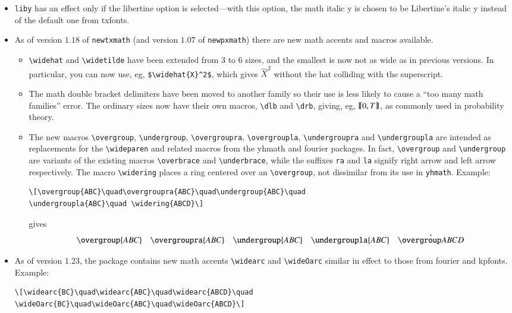 \documentclass[11pt]{article}
\theoremstyle{oldplain}
\theoremstyle{plain}
\begin{document}
\begin{itemize}
\item{\tt liby} has an effect only if the libertine option is selected---with this option, the math italic y is chosen to be Libertine's italic y instead of the default one from txfonts.
\item As of version $1.18$ of {\tt newtxmath} (and version $1.07$ of {\tt newpxmath}) there are new math accents and macros available.
\begin{itemize}
\item
\verb|\widehat| and \verb|\widetilde| have been extended from $3$ to $6$ sizes, and the smallest is now not as wide as in previous versions. In particular, you can now use, eg, \verb|$\widehat{X}^2$|, which gives $\widehat{X}^2$ without the hat colliding with the superscript.
\item The math double bracket delimiters have been moved to another family so their use is less likely to cause a ``too many math families'' error. The ordinary sizes now have their own macros, \verb|\dlb| and \verb|\drb|, giving, eg, $\dlb 0,T\drb$, as commonly used in probability theory.
\item The new macros \verb|\overgroup|, \verb|\undergroup|, \verb|\overgroupra|, \verb|\overgroupla|, \verb|\undergroupra| and \verb|\undergroupla| are intended as replacements for the \verb|\wideparen| and related macros from the \textsf{yhmath} and \textsf{fourier} packages. In fact, \verb|\overgroup| and \verb|\undergroup| are variants of the existing macros \verb|\overbrace| and \verb|\underbrace|, while the suffixes {\tt ra} and {\tt la} signify right arrow and left arrow respectively. The macro \verb|\widering| places a ring centered over an \verb|\overgroup|, not dissimilar from its use in {\tt yhmath}. Example:
\begin{verbatim}
\[\overgroup{ABC}\quad\overgroupra{ABC}\quad\undergroup{ABC}\quad
\undergroupla{ABC}\quad \widering{ABCD}\] 
\end{verbatim}
gives
\[\overgroup{ABC}\quad\overgroupra{ABC}\quad\undergroup{ABC}\quad\undergroupla{ABC}\quad\widering{ABCD}\] 
\end{itemize}
\item As of version $1.23$, the package contains new math accents \verb|\widearc| and \verb|\wideOarc| similar in effect to those from \textsf{fourier} and \textsf{kpfonts}. Example: 
\begin{verbatim}
\[\widearc{BC}\quad\widearc{ABC}\quad\widearc{ABCD}\quad
\wideOarc{BC}\quad\wideOarc{ABC}\quad\wideOarc{ABCD}\]
\end{verbatim}

\end{itemize}
\end{document}
